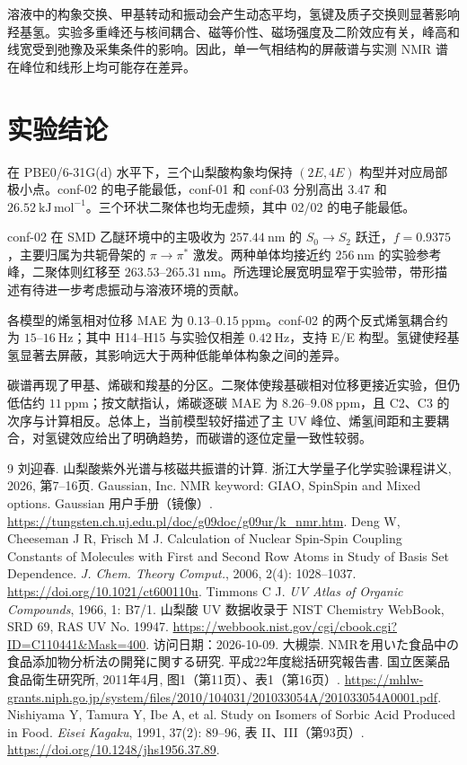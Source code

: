 \documentclass[a4paper,12pt]{article}
\begin{document}
溶液中的构象交换、甲基转动和振动会产生动态平均，氢键及质子交换则显著影响羟基氢。实验多重峰还与核间耦合、磁等价性、磁场强度及二阶效应有关，峰高和线宽受到弛豫及采集条件的影响。因此，单一气相结构的屏蔽谱与实测 NMR 谱在峰位和线形上均可能存在差异。

\clearpage
\section{实验结论}
在 PBE0/6-31G(d) 水平下，三个山梨酸构象均保持 $(2E,4E)$ 构型并对应局部极小点。conf-02 的电子能最低，conf-01 和 conf-03 分别高出 3.47 和 $26.52\ \mathrm{kJ\,mol^{-1}}$。三个环状二聚体也均无虚频，其中 02/02 的电子能最低。

conf-02 在 SMD 乙醚环境中的主吸收为 $257.44\ \mathrm{nm}$ 的 $S_0\rightarrow S_2$ 跃迁，$f=0.9375$，主要归属为共轭骨架的 $\pi\rightarrow\pi^*$ 激发。两种单体均接近约 $256\ \mathrm{nm}$ 的实验参考峰，二聚体则红移至 $263.53$--$265.31\ \mathrm{nm}$。所选理论展宽明显窄于实验带，带形描述有待进一步考虑振动与溶液环境的贡献。

各模型的烯氢相对位移 MAE 为 $0.13$--$0.15\ \mathrm{ppm}$。conf-02 的两个反式烯氢耦合约为 $15$--$16\ \mathrm{Hz}$；其中 H14--H15 与实验仅相差 $0.42\ \mathrm{Hz}$，支持 E/E 构型。氢键使羟基氢显著去屏蔽，其影响远大于两种低能单体构象之间的差异。

碳谱再现了甲基、烯碳和羧基的分区。二聚体使羧基碳相对位移更接近实验，但仍低估约 $11\ \mathrm{ppm}$；按文献指认，烯碳逐碳 MAE 为 $8.26$--$9.08\ \mathrm{ppm}$，且 C2、C3 的次序与计算相反。总体上，当前模型较好描述了主 UV 峰位、烯氢间距和主要耦合，对氢键效应给出了明确趋势，而碳谱的逐位定量一致性较弱。

\begin{thebibliography}{9}
\small
{} 刘迎春. 山梨酸紫外光谱与核磁共振谱的计算. 浙江大学量子化学实验课程讲义, 2026, 第7--16页.
 Gaussian, Inc. NMR keyword: GIAO, SpinSpin and Mixed options. Gaussian 用户手册（镜像）. \url{https://tungsten.ch.uj.edu.pl/doc/g09doc/g09ur/k_nmr.htm}.
 Deng W, Cheeseman J R, Frisch M J. Calculation of Nuclear Spin-Spin Coupling Constants of Molecules with First and Second Row Atoms in Study of Basis Set Dependence. \textit{J. Chem. Theory Comput.}, 2006, 2(4): 1028--1037. \url{https://doi.org/10.1021/ct600110u}.
 Timmons C J. \textit{UV Atlas of Organic Compounds}, 1966, 1: B7/1. 山梨酸 UV 数据收录于 NIST Chemistry WebBook, SRD 69, RAS UV No. 19947. \url{https://webbook.nist.gov/cgi/cbook.cgi?ID=C110441&Mask=400}. 访问日期：2026-10-09.
 大槻崇. NMRを用いた食品中の食品添加物分析法の開発に関する研究. 平成22年度総括研究報告書. 国立医薬品食品衛生研究所, 2011年4月, 图1（第11页）、表1（第16页）. \url{https://mhlw-grants.niph.go.jp/system/files/2010/104031/201033054A/201033054A0001.pdf}.
 Nishiyama Y, Tamura Y, Ibe A, et al. Study on Isomers of Sorbic Acid Produced in Food. \textit{Eisei Kagaku}, 1991, 37(2): 89--96, 表 II、III（第93页）. \url{https://doi.org/10.1248/jhs1956.37.89}.
\end{thebibliography}
\end{document}
